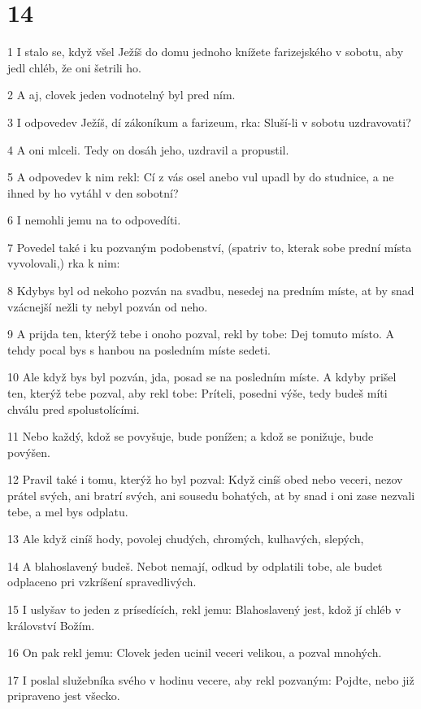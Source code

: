 \chapter{14}

\par 1 I stalo se, když všel Ježíš do domu jednoho knížete farizejského v sobotu, aby jedl chléb, že oni šetrili ho.
\par 2 A aj, clovek jeden vodnotelný byl pred ním.
\par 3 I odpovedev Ježíš, dí zákoníkum a farizeum, rka: Sluší-li v sobotu uzdravovati?
\par 4 A oni mlceli. Tedy on dosáh jeho, uzdravil a propustil.
\par 5 A odpovedev k nim rekl: Cí z vás osel anebo vul upadl by do studnice, a ne ihned by ho vytáhl v den sobotní?
\par 6 I nemohli jemu na to odpovedíti.
\par 7 Povedel také i ku pozvaným podobenství, (spatriv to, kterak sobe prední místa vyvolovali,) rka k nim:
\par 8 Kdybys byl od nekoho pozván na svadbu, nesedej na predním míste, at by snad vzácnejší nežli ty nebyl pozván od neho.
\par 9 A prijda ten, kterýž tebe i onoho pozval, rekl by tobe: Dej tomuto místo. A tehdy pocal bys s hanbou na posledním míste sedeti.
\par 10 Ale když bys byl pozván, jda, posad se na posledním míste. A kdyby prišel ten, kterýž tebe pozval, aby rekl tobe: Príteli, posedni výše, tedy budeš míti chválu pred spolustolícími.
\par 11 Nebo každý, kdož se povyšuje, bude ponížen; a kdož se ponižuje, bude povýšen.
\par 12 Pravil také i tomu, kterýž ho byl pozval: Když ciníš obed nebo veceri, nezov prátel svých, ani bratrí svých, ani sousedu bohatých, at by snad i oni zase nezvali tebe, a mel bys odplatu.
\par 13 Ale když ciníš hody, povolej chudých, chromých, kulhavých, slepých,
\par 14 A blahoslavený budeš. Nebot nemají, odkud by odplatili tobe, ale budet odplaceno pri vzkríšení spravedlivých.
\par 15 I uslyšav to jeden z prísedících, rekl jemu: Blahoslavený jest, kdož jí chléb v království Božím.
\par 16 On pak rekl jemu: Clovek jeden ucinil veceri velikou, a pozval mnohých.
\par 17 I poslal služebníka svého v hodinu vecere, aby rekl pozvaným: Pojdte, nebo již pripraveno jest všecko.
